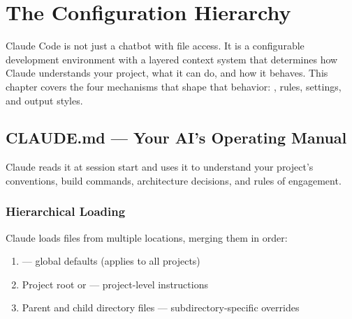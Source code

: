 \chapter{The Configuration Hierarchy}
\label{ch:configuration}

Claude Code is not just a chatbot with file access.
It is a configurable development environment with a layered context system
that determines how Claude understands your project, what it can do,
and how it behaves.
This chapter covers the four mechanisms that shape that behavior:
, rules, settings, and output styles.

\section{CLAUDE.md --- Your AI's Operating Manual}
\label{sec:claude-md}


Claude reads it at session start and uses it to understand your project's conventions,
build commands, architecture decisions, and rules of engagement.

\subsection{Hierarchical Loading}

Claude loads  files from multiple locations, merging them in order:

\begin{enumerate}
  \item {} --- global defaults (applies to all projects)
  \item Project root  or  --- project-level instructions
  \item Parent and child directory  files --- subdirectory-specific overrides
\end{enumerate}



